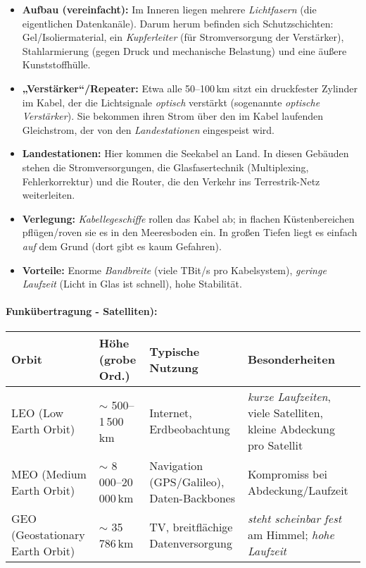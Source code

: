\documentclass[../skript/main.tex]{subfiles}
\begin{document}
	
	\begin{itemize}
		\item \textbf{Aufbau (vereinfacht):} Im Inneren liegen mehrere \emph{Lichtfasern} (die eigentlichen Datenkanäle). Darum herum befinden sich Schutzschichten: Gel/Isoliermaterial, ein \emph{Kupferleiter} (für Stromversorgung der Verstärker), Stahlarmierung (gegen Druck und mechanische Belastung) und eine äußere Kunststoffhülle.
		\item \textbf{„Verstärker“/Repeater:} Etwa alle 50–100\,km sitzt ein druckfester Zylinder im Kabel, der die Lichtsignale \emph{optisch} verstärkt (sogenannte \emph{optische Verstärker}). Sie bekommen ihren Strom über den im Kabel laufenden Gleichstrom, der von den \emph{Landestationen} eingespeist wird.
		\item \textbf{Landestationen:} Hier kommen die Seekabel an Land. In diesen Gebäuden stehen die Stromversorgungen, die Glasfasertechnik (Multiplexing, Fehlerkorrektur) und die Router, die den Verkehr ins Terrestrik-Netz weiterleiten.
		\item \textbf{Verlegung:} \emph{Kabellegeschiffe} rollen das Kabel ab; in flachen Küstenbereichen pflügen/roven sie es in den Meeresboden ein. In großen Tiefen liegt es einfach \emph{auf} dem Grund (dort gibt es kaum Gefahren).
		\item \textbf{Vorteile:} Enorme \emph{Bandbreite} (viele TBit/s pro Kabelsystem), \emph{geringe Laufzeit} (Licht in Glas ist schnell), hohe Stabilität.
	\end{itemize}
	
	\paragraph{Funkübertragung - Satelliten):}
\begin{center}
	\renewcommand{\arraystretch}{1.2}
	\begin{tabularx}{\linewidth}{@{}l l Y Y@{}}
		\hline
		\textbf{Orbit} & \textbf{Höhe (grobe Ord.)} & \textbf{Typische Nutzung} & \textbf{Besonderheiten} \\
		\hline
		LEO (Low Earth Orbit) & \(\sim\) 500--1\,500\,km & Internet, Erdbeobachtung & \emph{kurze Laufzeiten}, viele Satelliten, kleine Abdeckung pro Satellit \\
		MEO (Medium Earth Orbit) & \(\sim\) 8\,000--20\,000\,km & Navigation (GPS/Galileo), Daten-Backbones & Kompromiss bei Abdeckung/Laufzeit \\
		GEO (Geostationary Earth Orbit) & \(\sim\) 35\,786\,km & TV, breitflächige Datenversorgung & \emph{steht scheinbar fest} am Himmel; \emph{hohe Laufzeit} \\
		\hline
	\end{tabularx}
\end{center}
\end{document}

